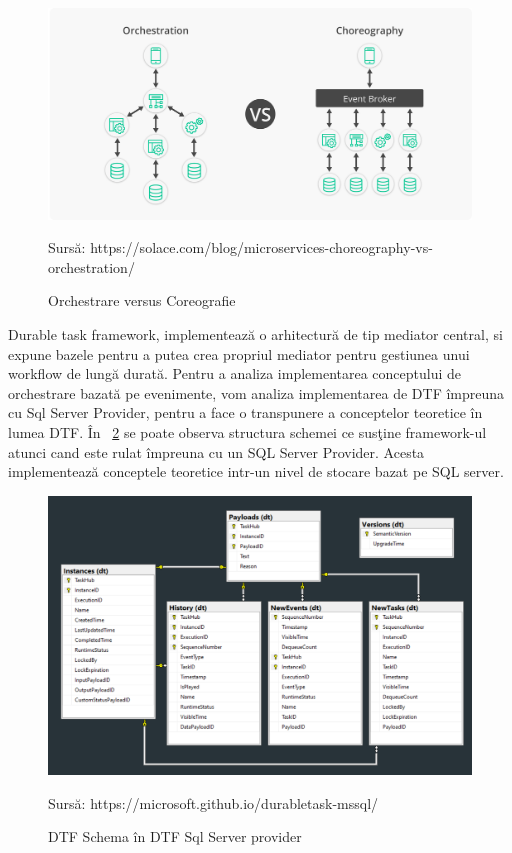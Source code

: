 \documentclass[a4paper,12pt]{report}
\newcommand{\source}[1]{\caption*{Sursă: {#1}} }
\begin{document}
\begin{figure}[h]
\begin{center}
        \includegraphics[width=1\textwidth]{images/Orchestration-VS-Choreography}
			 \caption{Orchestrare versus Coreografie}
			 \label{fig:orch_vs_coreografie}
			 \source {https://solace.com/blog/microservices-choreography-vs-orchestration/}
\end{center}
\end{figure}

\par Durable task framework, implementează o arhitectură de tip mediator central, si expune bazele pentru a putea crea propriul mediator pentru gestiunea unui workflow de lungă durată. Pentru a analiza implementarea conceptului de orchestrare bazată pe evenimente, vom analiza implementarea de DTF împreuna cu Sql Server Provider, pentru a face o transpunere a conceptelor teoretice în lumea DTF. În ~\ref{fig:sql-server-provider} se poate observa structura schemei ce susţine framework-ul atunci cand este rulat împreuna cu un SQL Server Provider. Acesta implementează conceptele teoretice intr-un nivel de stocare bazat pe SQL server. 
 
 \begin{figure}[h]
\begin{center}
        \includegraphics[width=1\textwidth]{images/sql-server-provider}
			 \caption{DTF Schema în DTF Sql Server provider}
			 \label{fig:sql-server-provider}
			 \source {https://microsoft.github.io/durabletask-mssql/}
\end{center}
\end{figure}
\end{document}
